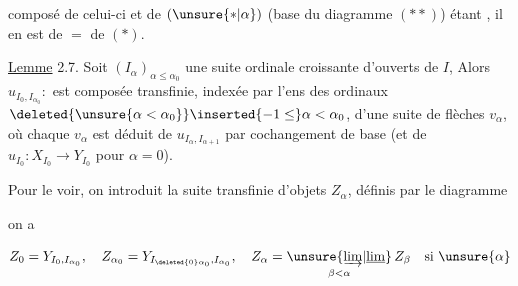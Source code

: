 
composé de celui-ci et de $(\unsure{*|\alpha})$  (base du diagramme  $(**)$) étant , il en est de $=$ de $(*)$.

\uline{Lemme} 2.7. Soit $(I_\alpha)_{\alpha\le\alpha_0}$ une suite ordinale croissante d'ouverts de $I$,  Alors $u_{I_0,I_{\alpha_0}}$$:$ est composée transfinie, indexée par l'ens des ordinaux $\deleted{\unsure{\alpha<\alpha_0}}\inserted{-1\le}\alpha<\alpha_0$, d'une suite de flèches $v_\alpha$, où chaque $v_\alpha$ est déduit de $u_{I_\alpha,I_{\alpha+1}}$ par cochangement de base (et de $u_{I_0}:X_{I_0}\longrightarrow Y_{I_0}$ pour $\alpha=0$).

Pour le voir, on introduit la suite transfinie d'objets $Z_\alpha$, définis par le  diagramme


on a 

\[
 Z_0=Y_{I_0,I_{\alpha_0}},\quad Z_{\alpha_0}=Y_{I_{\deleted{0}\alpha_0},I_{\alpha_0}},\quad
 Z_\alpha=\underset{\beta<\alpha}{\unsure{\underrightarrow{\lim}|\underline{\lim}}}\,Z_\beta
 \quad\text{si }\unsure{\alpha}
\]


